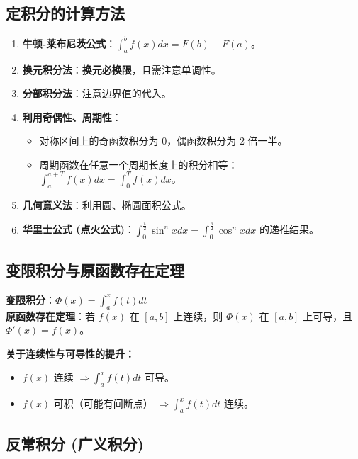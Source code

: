 \documentclass[a4paper,12pt]{ctexart}
\newenvironment{purplebox}
  {\begin{tcolorbox}[colback=white, colframe=boxpurple, boxrule=1pt, sharp corners, title=\textbf{定义/定理}]}
  {\end{tcolorbox}}
\newenvironment{rednote}
  {\begin{tcolorbox}[colback=notepurple, colframe=highlightred, boxrule=1pt, title=\textbf{重点/技巧}]}
  {\end{tcolorbox}}
\begin{document}
\subsection{定积分的计算方法}
\begin{enumerate}
    \item \textbf{牛顿-莱布尼茨公式}：$\int_a^b f(x) dx = F(b) - F(a)$。
    \item \textbf{换元积分法}：\textbf{换元必换限}，且需注意单调性。
    \item \textbf{分部积分法}：注意边界值的代入。
    \item \textbf{利用奇偶性、周期性}：
    \begin{itemize}
        \item 对称区间上的奇函数积分为 0，偶函数积分为 2 倍一半。
        \item 周期函数在任意一个周期长度上的积分相等：$\int_a^{a+T} f(x) dx = \int_0^T f(x) dx$。
    \end{itemize}
    \item \textbf{几何意义法}：利用圆、椭圆面积公式。
    \item \textbf{华里士公式 (点火公式)}：$\int_0^{\frac{\pi}{2}} \sin^n x dx = \int_0^{\frac{\pi}{2}} \cos^n x dx$ 的递推结果。
\end{enumerate}

\subsection{变限积分与原函数存在定理}
\begin{purplebox}
    \textbf{变限积分}：$\Phi(x) = \int_a^x f(t) dt$ \\
    \textbf{原函数存在定理}：若 $f(x)$ 在 $[a, b]$ 上连续，则 $\Phi(x)$ 在 $[a, b]$ 上可导，且 $\Phi'(x) = f(x)$。
\end{purplebox}

\begin{rednote}
    \textbf{关于连续性与可导性的提升：}
    \begin{itemize}
        \item $f(x)$ 连续 $\Rightarrow \int_a^x f(t) dt$ 可导。
        \item $f(x)$ 可积（可能有间断点） $\Rightarrow \int_a^x f(t) dt$ 连续。
    \end{itemize}
\end{rednote}

\subsection{反常积分 (广义积分)}
\end{document}
